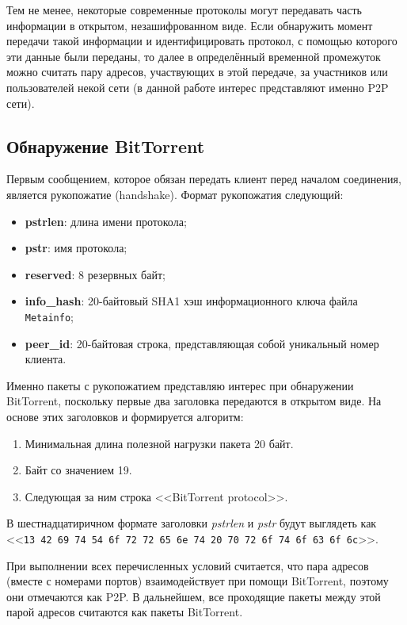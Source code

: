 \documentclass[bachelor, och, coursework]{SCWorks}
\begin{document}
Тем не менее, некоторые современные протоколы могут передавать часть информации в открытом, незашифрованном виде. Если обнаружить момент передачи такой информации и идентифицировать протокол, с помощью которого эти данные были переданы, то далее в определённый временной промежуток можно считать пару адресов, участвующих в этой передаче, за участников или пользователей некой сети (в данной работе интерес представляют именно P2P сети).

\subsection{Обнаружение BitTorrent}
Первым сообщением, которое обязан передать клиент перед началом соединения, является рукопожатие (handshake).
Формат рукопожатия следующий:
\begin{itemize}
    \item \textbf{pstrlen}: длина имени протокола;
    \item \textbf{pstr}: имя протокола;
    \item \textbf{reserved}: 8 резервных байт;
    \item \textbf{info_hash}: 20-байтовый SHA1 хэш информационного ключа файла \\ \texttt{Metainfo};
    \item \textbf{peer_id}: 20-байтовая строка, представляющая собой уникальный номер клиента.
\end{itemize}

Именно пакеты с рукопожатием представляю интерес при обнаружении BitTorrent, поскольку первые два заголовка передаются в открытом виде. На основе этих заголовков и формируется алгоритм:
\begin{enumerate}
    \item Минимальная длина полезной нагрузки пакета 20 байт.
    \item Байт со значением 19.
    \item Следующая за ним строка <<BitTorrent protocol>>.
\end{enumerate}

В шестнадцатиричном формате заголовки \textit{pstrlen} и \textit{pstr} будут выглядеть как <<\texttt{13 42 69 74 54 6f 72 72 65 6e 74 20 70 72 6f 74 6f 63 6f 6c}>>.

При выполнении всех перечисленных условий считается, что пара адресов (вместе с номерами портов) взаимодействует при помощи BitTorrent, поэтому они отмечаются как P2P. В дальнейшем, все проходящие пакеты между этой парой адресов считаются как пакеты BitTorrent.
\end{document}

